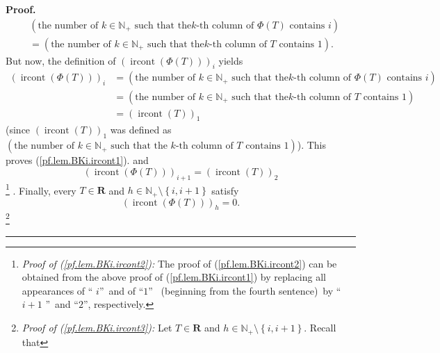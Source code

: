 \documentclass[numbers=enddot,12pt,final,onecolumn,notitlepage]{scrartcl}%
\theoremstyle{definition}
\newenvironment{proof}[1][Proof]{\noindent\textbf{#1.} }{\ \rule{0.5em}{0.5em}}
\newenvironment{verlong}{}{}
\begin{document}
\begin{verlong}
\begin{proof}
{\begin{align*}
&  \left(  \text{the number of }k\in\mathbb{N}_{+}\text{ such that the
}k\text{-th column of }\Phi\left(  T\right)  \text{ contains }i\right) \\
&  =\left(  \text{the number of }k\in\mathbb{N}_{+}\text{ such that the
}k\text{-th column of }T\text{ contains }1\right)  .
\end{align*}
But now, the definition of $\left(  \operatorname*{ircont}\left(  \Phi\left(
T\right)  \right)  \right)  _{i}$ yields%
\begin{align*}
\left(  \operatorname*{ircont}\left(  \Phi\left(  T\right)  \right)  \right)
_{i}  &  =\left(  \text{the number of }k\in\mathbb{N}_{+}\text{ such that the
}k\text{-th column of }\Phi\left(  T\right)  \text{ contains }i\right) \\
&  =\left(  \text{the number of }k\in\mathbb{N}_{+}\text{ such that the
}k\text{-th column of }T\text{ contains }1\right) \\
&  =\left(  \operatorname*{ircont}\left(  T\right)  \right)  _{1}%
\end{align*}
(since $\left(  \operatorname*{ircont}\left(  T\right)  \right)  _{1}$ was
defined as \newline$\left(  \text{the number of }k\in\mathbb{N}_{+}\text{ such
that the }k\text{-th column of }T\text{ contains }1\right)  $). This proves
(\ref{pf.lem.BKi.ircont1}).} and%
\begin{equation}
\left(  \operatorname*{ircont}\left(  \Phi\left(  T\right)  \right)  \right)
_{i+1}=\left(  \operatorname*{ircont}\left(  T\right)  \right)  _{2}
\label{pf.lem.BKi.ircont2}%
\end{equation}
\footnote{\textit{Proof of (\ref{pf.lem.BKi.ircont2}):} The proof of
(\ref{pf.lem.BKi.ircont2}) can be obtained from the above proof of
(\ref{pf.lem.BKi.ircont1}) by replacing all appearances of \textquotedblleft%
$i$\textquotedblright\ and of \textquotedblleft$1$\textquotedblright%
\ (beginning from the fourth sentence)\ by \textquotedblleft$i+1$%
\textquotedblright\ and \textquotedblleft$2$\textquotedblright, respectively.}%
. Finally, every $T\in\mathbf{R}$ and $h\in\mathbb{N}_{+}\setminus\left\{
i,i+1\right\}  $ satisfy%
\begin{equation}
\left(  \operatorname*{ircont}\left(  \Phi\left(  T\right)  \right)  \right)
_{h}=0. \label{pf.lem.BKi.ircont3}%
\end{equation}
\footnote{\textit{Proof of (\ref{pf.lem.BKi.ircont3}):} Let $T\in\mathbf{R}$
and $h\in\mathbb{N}_{+}\setminus\left\{  i,i+1\right\}  $. Recall that
}
\end{proof}
\end{verlong}
\end{document}
